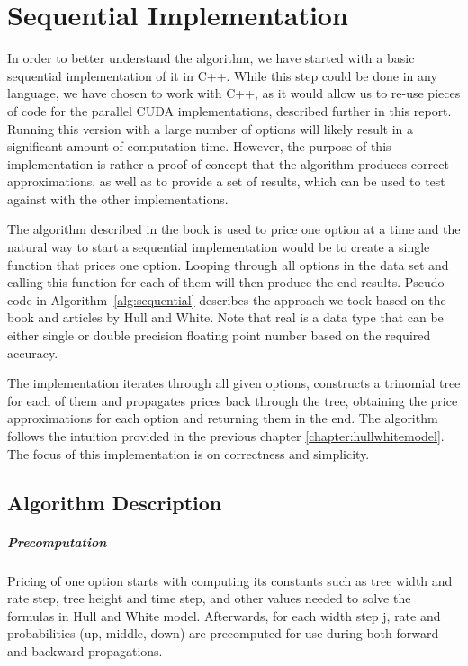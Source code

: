 \chapter{Sequential Implementation}
\label{chapter:sequential}
In order to better understand the algorithm, we have started with a basic sequential implementation of it in C++. While this step could be done in any language, we have chosen to work with C++, as it would allow us to re-use pieces of code for the parallel CUDA implementations, described further in this report. Running this version with a large number of options will likely result in a significant amount of computation time. However, the purpose of this implementation is rather a proof of concept that the algorithm produces correct approximations, as well as to provide a set of results, which can be used to test against with the other implementations.

The algorithm described in the book is used to price one option at a time and the natural way to start a sequential implementation would be to create a single function that prices one option. Looping through all options in the data set and calling this function for each of them will then produce the end results. Pseudo-code in Algorithm~\ref{alg:sequential} describes the approach we took based on the book and articles by Hull and White. Note that real is a data type that can be either single or double precision floating point number based on the required accuracy.

The implementation iterates through all given options, constructs a trinomial tree for each of them and propagates prices back through the tree, obtaining the price approximations for each option and returning them in the end. The algorithm follows the intuition provided in the previous chapter \ref{chapter:hullwhitemodel}. The focus of this implementation is on correctness and simplicity.

\pagebreak
\section{Algorithm Description}
\paragraph{Precomputation}
Pricing of one option starts with computing its constants such as tree width and rate step, tree height and time step, and other values needed to solve the formulas in Hull and White model. Afterwards, for each width step j, rate and probabilities (up, middle, down) are precomputed for use during both forward and backward propagations.

